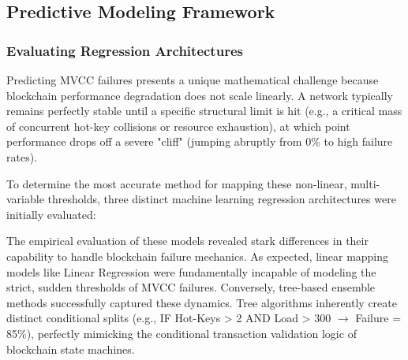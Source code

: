 \documentclass[12pt]{article}
\begin{document}
\subsection{Predictive Modeling Framework}



\subsubsection{Evaluating Regression Architectures}
Predicting MVCC failures presents a unique mathematical challenge because blockchain performance degradation does not scale linearly. A network typically remains perfectly stable until a specific structural limit is hit (e.g., a critical mass of concurrent hot-key collisions or resource exhaustion), at which point performance drops off a severe "cliff" (jumping abruptly from 0\% to high failure rates). 

To determine the most accurate method for mapping these non-linear, multi-variable thresholds, three distinct machine learning regression architectures were initially evaluated:

\begin{table}[ht]
\centering
\caption{Evaluated Machine Learning Regression Architectures}
\label{tab:ml_models}
\end{table}

The empirical evaluation of these models revealed stark differences in their capability to handle blockchain failure mechanics. As expected, linear mapping models like Linear Regression were fundamentally incapable of modeling the strict, sudden thresholds of MVCC failures. Conversely, tree-based ensemble methods successfully captured these dynamics. Tree algorithms inherently create distinct conditional splits (e.g., IF Hot-Keys > 2 AND Load > 300 $\rightarrow$ Failure = 85\%), perfectly mimicking the conditional transaction validation logic of blockchain state machines. 
\end{document}
